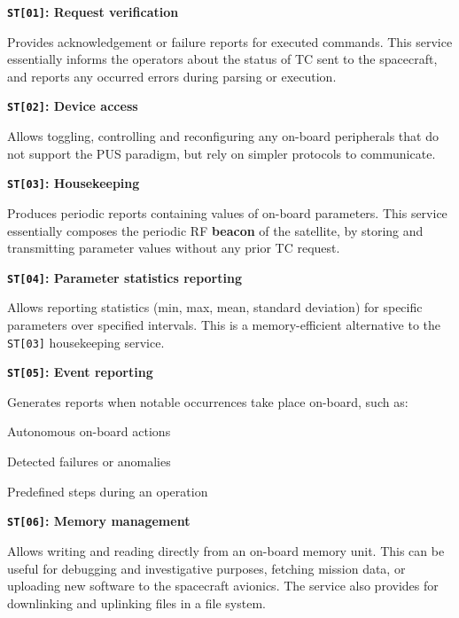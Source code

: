 \documentclass[a4paper,nobib]{tufte-book}
\begin{document}
\begin{compactitem}
	\item \textbf{\texttt{ST[01]}: Request verification}
	
	Provides acknowledgement or failure reports for executed commands. This service essentially informs the operators about the status of \ac{TC} sent to the spacecraft, and reports any occurred errors during parsing or execution.
	
	\item \textbf{\texttt{ST[02]}: Device access}
	
	Allows toggling, controlling and reconfiguring any on-board peripherals that do not support the \ac{PUS} paradigm, but rely on simpler protocols to communicate.
	
	\item \textbf{\texttt{ST[03]}: Housekeeping}
	
	Produces periodic reports containing values of on-board parameters. This service essentially composes the periodic \acs{RF} \textbf{beacon} of the satellite, by storing and transmitting parameter values without any prior \acs{TC} request.
	
	\item \textbf{\texttt{ST[04]}: Parameter statistics reporting}
	
	Allows reporting statistics (min, max, mean, standard deviation) for specific parameters over specified intervals. This is a memory-efficient alternative to the \texttt{ST[03]} housekeeping service.
	
	\item \textbf{\texttt{ST[05]}: Event reporting}
	
	Generates reports when notable occurrences take place on-board, such as:
	\begin{compactitem}
		\item Autonomous on-board actions
		\item Detected failures or anomalies
		\item Predefined steps during an operation
	\end{compactitem}
	
	\item \textbf{\texttt{ST[06]}: Memory management}
	
	Allows writing and reading directly from an on-board memory unit. This can be useful for debugging and investigative purposes, fetching mission data, or uploading new software to the spacecraft avionics. The service also provides for downlinking and uplinking files in a file system.
	

\end{compactitem}
\end{document}
